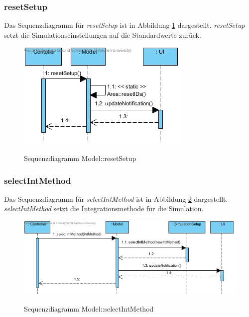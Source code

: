 \subsubsection*{resetSetup}

Das Sequenzdiagramm für \emph{resetSetup} ist in Abbildung \ref{Sequenzdiagramm Model::resetSetup} dargestellt. \emph{resetSetup} setzt die Simulationseinstellungen auf die Standardwerte zurück.

\begin{figure}[H]
	\centering
	\includegraphics[scale=.85]{Bilder/Model__resetSetup().jpg}\\
	\caption{Sequenzdiagramm Model::resetSetup}
	\label{Sequenzdiagramm Model::resetSetup}
\end{figure}

\subsubsection*{selectIntMethod}

Das Sequenzdiagramm für \emph{selectIntMethod} ist in Abbildung \ref{Sequenzdiagramm Model::selectIntMethod} dargestellt. \emph{selectIntMethod} setzt die Integrationsmethode für die Simulation.

\begin{figure}[H]
	\centering
	\includegraphics[scale=.8]{Bilder/Model__selectIntMethod().jpg}\\
	\caption{Sequenzdiagramm Model::selectIntMethod}
	\label{Sequenzdiagramm Model::selectIntMethod}
\end{figure}

